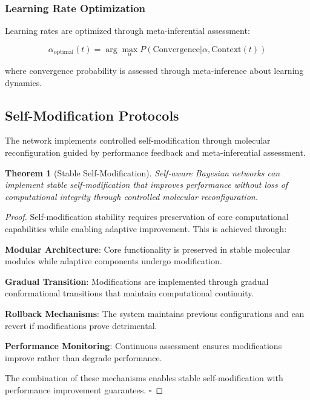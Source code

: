 \documentclass[12pt,a4paper]{article}
\newtheorem{theorem}{Theorem}[section]
\begin{document}
\subsubsection{Learning Rate Optimization}

Learning rates are optimized through meta-inferential assessment:

\begin{equation}
\alpha_{\text{optimal}}(t) = \arg\max_{\alpha} P(\text{Convergence} | \alpha, \text{Context}(t))
\end{equation}

where convergence probability is assessed through meta-inference about learning dynamics.

\subsection{Self-Modification Protocols}

The network implements controlled self-modification through molecular reconfiguration guided by performance feedback and meta-inferential assessment.

\begin{theorem}[Stable Self-Modification]
Self-aware Bayesian networks can implement stable self-modification that improves performance without loss of computational integrity through controlled molecular reconfiguration.
\end{theorem}

\begin{proof}
Self-modification stability requires preservation of core computational capabilities while enabling adaptive improvement. This is achieved through:

\textbf{Modular Architecture}: Core functionality is preserved in stable molecular modules while adaptive components undergo modification.

\textbf{Gradual Transition}: Modifications are implemented through gradual conformational transitions that maintain computational continuity.

\textbf{Rollback Mechanisms}: The system maintains previous configurations and can revert if modifications prove detrimental.

\textbf{Performance Monitoring}: Continuous assessment ensures modifications improve rather than degrade performance.

The combination of these mechanisms enables stable self-modification with performance improvement guarantees. $\square$
\end{proof}
\end{document}
